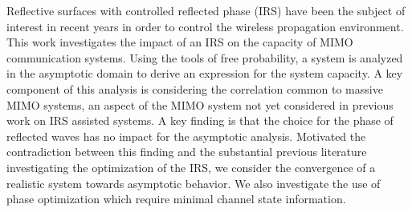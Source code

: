 Reflective surfaces with controlled reflected phase (IRS) have been the subject of interest in recent years in order to control the wireless propagation environment. This work investigates the impact of an IRS on the capacity of MIMO communication systems. Using the tools of free probability, a system is analyzed in the asymptotic domain to derive an expression for the system capacity. A key component of this analysis is considering the correlation common to massive MIMO systems, an aspect of the MIMO system not yet considered in previous work on IRS assisted systems. A key finding is that the choice for the phase of reflected waves has no impact for the asymptotic analysis. Motivated the contradiction between this finding and the substantial previous literature investigating the optimization of the IRS, we consider the convergence of a realistic system towards asymptotic behavior. We also investigate the use of phase optimization which require minimal channel state information. 